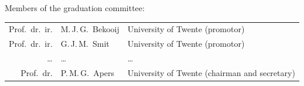 \thispagestyle{empty}%
%
\makeatletter\everypage@\makeatother%
{%
	\small%
	\begin{flushleft}
	Members of the graduation committee:\\
	\bigskip
	\begin{tabular}{@{}r@{~~}ll}
	Prof.~dr.~ir.\@		& M.\,J.\,G.~Bekooij	& University of Twente (promotor) \\
	Prof.~dr.~ir.\@		& G.\,J.\,M.~Smit		& University of Twente (promotor) \\
	\ldots				& \ldots				& \ldots \\
	Prof.~dr.\@			& P.\,M.\,G.~Apers		& University of Twente (chairman and secretary) \\
	\end{tabular}

	\vfill


\end{flushleft}}
